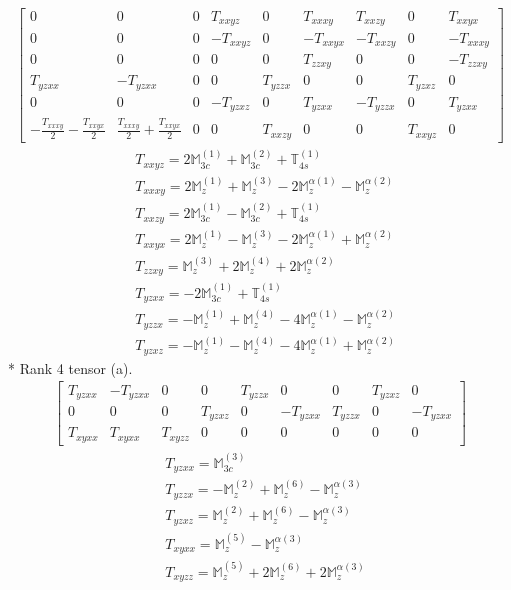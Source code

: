 \documentclass[fleqn,8pt,landscape]{jsarticle}
\begin{document}
\begin{align*}
\begin{bmatrix} 0 & 0 & 0 & T_{xxyz} & 0 & T_{xxxy} & T_{xxzy} & 0 & T_{xxyx} \\ 0 & 0 & 0 & - T_{xxyz} & 0 & - T_{xxyx} & - T_{xxzy} & 0 & - T_{xxxy} \\ 0 & 0 & 0 & 0 & 0 & T_{zzxy} & 0 & 0 & - T_{zzxy} \\ T_{yzxx} & - T_{yzxx} & 0 & 0 & T_{yzzx} & 0 & 0 & T_{yzxz} & 0 \\ 0 & 0 & 0 & - T_{yzxz} & 0 & T_{yzxx} & - T_{yzzx} & 0 & T_{yzxx} \\ - \frac{T_{xxxy}}{2} - \frac{T_{xxyx}}{2} & \frac{T_{xxxy}}{2} + \frac{T_{xxyx}}{2} & 0 & 0 & T_{xxzy} & 0 & 0 & T_{xxyz} & 0 \end{bmatrix}
\end{align*}
\begin{align*}
& T_{xxyz} = 2 \mathbb{M}_{3c}^{(1)} + \mathbb{M}_{3c}^{(2)} + \mathbb{T}_{4s}^{(1)} \\
& T_{xxxy} = 2 \mathbb{M}_{z}^{(1)} + \mathbb{M}_{z}^{(3)} - 2 \mathbb{M}_{z}^{\alpha(1)} - \mathbb{M}_{z}^{\alpha(2)} \\
& T_{xxzy} = 2 \mathbb{M}_{3c}^{(1)} - \mathbb{M}_{3c}^{(2)} + \mathbb{T}_{4s}^{(1)} \\
& T_{xxyx} = 2 \mathbb{M}_{z}^{(1)} - \mathbb{M}_{z}^{(3)} - 2 \mathbb{M}_{z}^{\alpha(1)} + \mathbb{M}_{z}^{\alpha(2)} \\
& T_{zzxy} = \mathbb{M}_{z}^{(3)} + 2 \mathbb{M}_{z}^{(4)} + 2 \mathbb{M}_{z}^{\alpha(2)} \\
& T_{yzxx} = - 2 \mathbb{M}_{3c}^{(1)} + \mathbb{T}_{4s}^{(1)} \\
& T_{yzzx} = - \mathbb{M}_{z}^{(1)} + \mathbb{M}_{z}^{(4)} - 4 \mathbb{M}_{z}^{\alpha(1)} - \mathbb{M}_{z}^{\alpha(2)} \\
& T_{yzxz} = - \mathbb{M}_{z}^{(1)} - \mathbb{M}_{z}^{(4)} - 4 \mathbb{M}_{z}^{\alpha(1)} + \mathbb{M}_{z}^{\alpha(2)}
\end{align*}
* Rank 4 tensor (a).
\begin{align*}
\begin{bmatrix} T_{yzxx} & - T_{yzxx} & 0 & 0 & T_{yzzx} & 0 & 0 & T_{yzxz} & 0 \\ 0 & 0 & 0 & T_{yzxz} & 0 & - T_{yzxx} & T_{yzzx} & 0 & - T_{yzxx} \\ T_{xyxx} & T_{xyxx} & T_{xyzz} & 0 & 0 & 0 & 0 & 0 & 0 \end{bmatrix}
\end{align*}
\begin{align*}
& T_{yzxx} = \mathbb{M}_{3c}^{(3)} \\
& T_{yzzx} = - \mathbb{M}_{z}^{(2)} + \mathbb{M}_{z}^{(6)} - \mathbb{M}_{z}^{\alpha(3)} \\
& T_{yzxz} = \mathbb{M}_{z}^{(2)} + \mathbb{M}_{z}^{(6)} - \mathbb{M}_{z}^{\alpha(3)} \\
& T_{xyxx} = \mathbb{M}_{z}^{(5)} - \mathbb{M}_{z}^{\alpha(3)} \\
& T_{xyzz} = \mathbb{M}_{z}^{(5)} + 2 \mathbb{M}_{z}^{(6)} + 2 \mathbb{M}_{z}^{\alpha(3)}
\end{align*}
\end{document}
